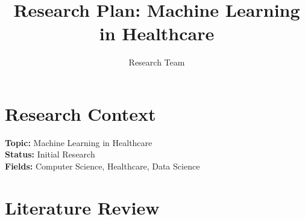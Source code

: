 \documentclass[conference]{IEEEtran}
\begin{document}
\title{ Research Plan: Machine Learning in Healthcare }
\author{ Research Team }
\maketitle


\section{ Research Context }
\textbf{Topic:} Machine Learning in Healthcare \\
\textbf{Status:} Initial Research \\
\textbf{Fields:} Computer Science, Healthcare, Data Science \\

\section{ Literature Review }
\end{document}
